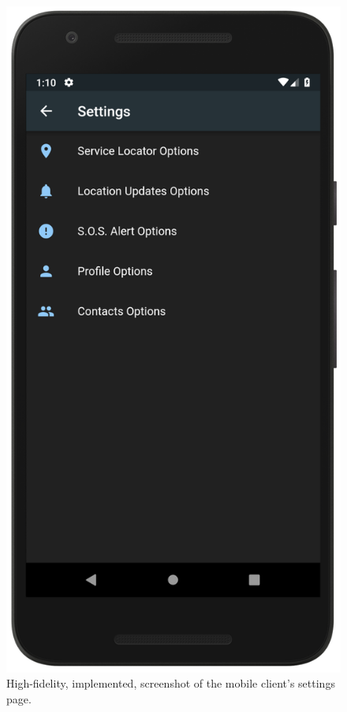 \documentclass[10pt, a4paper]{article}
\begin{document}
\begin{figure}[H]
  \includegraphics[width=\linewidth]{demo_settings.png}
  \caption{High-fidelity, implemented, screenshot of the mobile client's settings page.}\label{fig:mobile3}
\endminipage
\end{figure}
\end{document}
